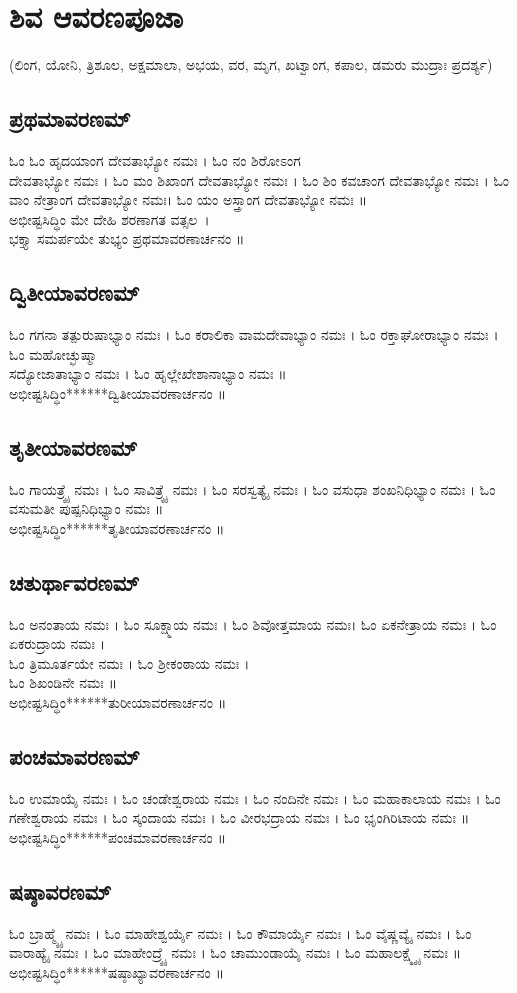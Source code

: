 \section{ಶಿವ ಆವರಣಪೂಜಾ}
(ಲಿಂಗ, ಯೋನಿ, ತ್ರಿಶೂಲ, ಅಕ್ಷಮಾಲಾ, ಅಭಯ, ವರ, ಮೃಗ, ಖಟ್ವಾಂಗ, ಕಪಾಲ, ಡಮರು ಮುದ್ರಾಃ ಪ್ರದರ್ಶ್ಯ)
\subsection{ಪ್ರಥಮಾವರಣಮ್}
ಓಂ ಓಂ ಹೃದಯಾಂಗ ದೇವತಾಭ್ಯೋ ನಮಃ । ಓಂ ನಂ ಶಿರೋಽಂಗ \\ದೇವತಾಭ್ಯೋ ನಮಃ । ಓಂ ಮಂ ಶಿಖಾಂಗ ದೇವತಾಭ್ಯೋ ನಮಃ । ಓಂ ಶಿಂ ಕವಚಾಂಗ ದೇವತಾಭ್ಯೋ ನಮಃ । ಓಂ ವಾಂ ನೇತ್ರಾಂಗ ದೇವತಾಭ್ಯೋ ನಮಃ। ಓಂ ಯಂ ಅಸ್ತ್ರಾಂಗ ದೇವತಾಭ್ಯೋ ನಮಃ ॥\\
ಅಭೀಷ್ಟಸಿದ್ಧಿಂ ಮೇ ದೇಹಿ ಶರಣಾಗತ ವತ್ಸಲ~।\\
ಭಕ್ತ್ಯಾ ಸಮರ್ಪಯೇ ತುಭ್ಯಂ ಪ್ರಥಮಾವರಣಾರ್ಚನಂ ॥
\subsection{ದ್ವಿತೀಯಾವರಣಮ್}
ಓಂ ಗಗನಾ ತತ್ಪುರುಷಾಭ್ಯಾಂ ನಮಃ । ಓಂ ಕರಾಲಿಕಾ ವಾಮದೇವಾಭ್ಯಾಂ ನಮಃ । ಓಂ ರಕ್ತಾಘೋರಾಭ್ಯಾಂ ನಮಃ । ಓಂ ಮಹೋಚ್ಛುಷ್ಮಾ \\ಸದ್ಯೋಜಾತಾಭ್ಯಾಂ ನಮಃ । ಓಂ ಹೃಲ್ಲೇಖೇಶಾನಾಭ್ಯಾಂ ನಮಃ ॥\\
ಅಭೀಷ್ಟಸಿದ್ಧಿಂ******ದ್ವಿತೀಯಾವರಣಾರ್ಚನಂ ॥
\subsection{ತೃತೀಯಾವರಣಮ್}
ಓಂ ಗಾಯತ್ರ್ಯೈ ನಮಃ । ಓಂ ಸಾವಿತ್ರ್ಯೈ ನಮಃ । ಓಂ ಸರಸ್ವತ್ಯೈ ನಮಃ । ಓಂ ವಸುಧಾ ಶಂಖನಿಧಿಭ್ಯಾಂ ನಮಃ । ಓಂ ವಸುಮತೀ ಪುಷ್ಪನಿಧಿಭ್ಯಾಂ ನಮಃ ॥\\
ಅಭೀಷ್ಟಸಿದ್ಧಿಂ******ತೃತೀಯಾವರಣಾರ್ಚನಂ ॥
\subsection{ಚತುರ್ಥಾವರಣಮ್}
ಓಂ ಅನಂತಾಯ ನಮಃ । ಓಂ ಸೂಕ್ಷ್ಮಾಯ ನಮಃ । ಓಂ ಶಿವೋತ್ತಮಾಯ ನಮಃ। ಓಂ ಏಕನೇತ್ರಾಯ ನಮಃ । ಓಂ ಏಕರುದ್ರಾಯ ನಮಃ । \\ಓಂ ತ್ರಿಮೂರ್ತಯೇ ನಮಃ । ಓಂ ಶ್ರೀಕಂಠಾಯ ನಮಃ ।\\ ಓಂ ಶಿಖಂಡಿನೇ ನಮಃ ॥\\
ಅಭೀಷ್ಟಸಿದ್ಧಿಂ******ತುರೀಯಾವರಣಾರ್ಚನಂ ॥
\subsection{ಪಂಚಮಾವರಣಮ್}
ಓಂ ಉಮಾಯೈ ನಮಃ । ಓಂ ಚಂಡೇಶ್ವರಾಯ ನಮಃ । ಓಂ ನಂದಿನೇ ನಮಃ । ಓಂ ಮಹಾಕಾಲಾಯ ನಮಃ । ಓಂ ಗಣೇಶ್ವರಾಯ ನಮಃ । ಓಂ ಸ್ಕಂದಾಯ ನಮಃ । ಓಂ ವೀರಭದ್ರಾಯ ನಮಃ । ಓಂ ಭೃಂಗಿರಿಟಾಯ ನಮಃ ॥\\
ಅಭೀಷ್ಟಸಿದ್ಧಿಂ******ಪಂಚಮಾವರಣಾರ್ಚನಂ ॥
\subsection{ಷಷ್ಠಾವರಣಮ್}
ಓಂ ಬ್ರಾಹ್ಮ್ಯೈ ನಮಃ । ಓಂ ಮಾಹೇಶ್ವರ್ಯೈ ನಮಃ । ಓಂ ಕೌಮಾರ್ಯೈ ನಮಃ । ಓಂ ವೈಷ್ಣವ್ಯೈ ನಮಃ । ಓಂ ವಾರಾಹ್ಯೈ ನಮಃ । ಓಂ ಮಾಹೇಂದ್ರ್ಯೈ ನಮಃ । ಓಂ ಚಾಮುಂಡಾಯೈ ನಮಃ । ಓಂ ಮಹಾಲಕ್ಷ್ಮ್ಯೈ ನಮಃ ॥\\
ಅಭೀಷ್ಟಸಿದ್ಧಿಂ******ಷಷ್ಠಾಖ್ಯಾವರಣಾರ್ಚನಂ ॥
